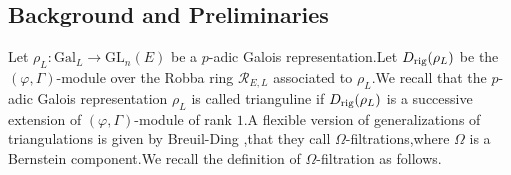 \documentclass[SecEq,CM,GP]{degruyter-crelle} %
\theoremstyle{plain}
\newcommand{\rig}{{\rm rig}}
\newcommand{\cR}{\mathcal R}
\begin{document}
\subsection{Background and Preliminaries}\label{BPFORPAPAIINV}

Let $\rho_L:\mathrm{Gal}_L \rightarrow\mathrm{GL}_n(E)$ be a $p$-adic Galois representation.\;Let $D_{\rig}(\rho_L)$ be the $(\varphi,\Gamma)$-module over the Robba ring $\cR_{E,L}$ associated to $\rho_L$.\;We recall that the $p$-adic Galois representation $\rho_L$ is called trianguline if $D_{\rig}(\rho_L)$ is a successive extension of $(\varphi,\Gamma)$-module of rank $1$.\;A flexible version of generalizations of triangulations is given by Breuil-Ding \cite[Definition 4.1.6]{Ding2021},\;that they call $\Omega$-filtrations,\;where $\Omega$ is a Bernstein component.\;We recall the definition of $\Omega$-filtration as follows.\;
\end{document}
